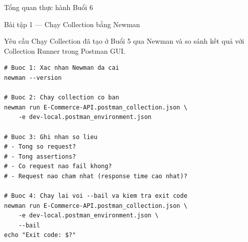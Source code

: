 \documentclass[aspectratio=169,10pt]{beamer}
\begin{document}
\begin{frame}[shrink=10]{Tổng quan thực hành Buổi 6}
  \begin{center}
  \tiny
  \end{center}
\end{frame}

\begin{frame}[fragile]{Bài tập 1 --- Chạy Collection bằng Newman}
  \begin{block}{Yêu cầu}
    Chạy Collection đã tạo ở Buổi 5 qua Newman và so sánh kết quả
    với Collection Runner trong Postman GUI.
  \end{block}

\begin{lstlisting}[style=bash]
# Buoc 1: Xac nhan Newman da cai
newman --version

# Buoc 2: Chay collection co ban
newman run E-Commerce-API.postman_collection.json \
    -e dev-local.postman_environment.json

# Buoc 3: Ghi nhan so lieu
# - Tong so request?
# - Tong assertions?
# - Co request nao fail khong?
# - Request nao cham nhat (response time cao nhat)?

# Buoc 4: Chay lai voi --bail va kiem tra exit code
newman run E-Commerce-API.postman_collection.json \
    -e dev-local.postman_environment.json \
    --bail
echo "Exit code: $?"
\end{lstlisting}
\end{frame}
\end{document}
